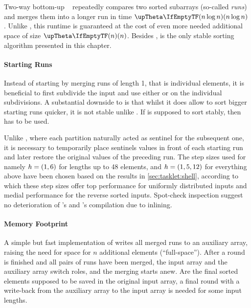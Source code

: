 \section{\texorpdfstring{\MS{}}{MergeSort}}
\label{sec:tasklet:merge}

Two-way bottom-up \MS{}~\cite{katajainen1997meticulous} repeatedly compares two sorted subarrays (so-called \emph{runs}) and merges them into a longer run in time \(\bigtheta{n \log n}\).
Unlike \QS{}, this runtime is guaranteed at the cost of even more needed additional space of size \(\bigtheta{n}\).
Besides \IS{}, \MS{} is the only stable sorting algorithm presented in this chapter.


\paragraph{Starting Runs}
Instead of starting by merging runs of length 1, that is individual elements, it is beneficial to first subdivide the input and use either \IS{} or \ShS{} on the individual subdivisions.
A substantial downside to \ShS{} is that whilst it does allow to sort bigger starting runs quicker, it is not stable unlike \IS{}.
If \MS{} is supposed to sort stably, then \IS{} has to be used.

Unlike \QS{}, where each partition naturally acted as sentinel for the subsequent one, it is necessary to temporarily place sentinels values in front of each starting run and later restore the original values of the preceding run.
The step sizes used for \ShS{} \Dash namely \(h = (1, 6)\) for lengths up to 48 elements, and \(h = (1, 5, 12)\) for everything above \Dash have been chosen based on the results in \cref{sec:tasklet:shell}, according to which these step sizes offer top performance for uniformly distributed inputs and medial performance for the reverse sorted inputs.
Spot-check inspection suggest no deterioration of \IS{}'s and \ShS{}'s compilation due to inlining.


\paragraph{Memory Footprint}
A simple but fast implementation of \MS{} writes all merged runs to an auxiliary array, raising the need for space for \(n\) additional elements (\enquote{full-space}).
After a round is finished and all pairs of runs have been merged, the input array and the auxiliary array switch roles, and the merging starts anew.
Are the final sorted elements supposed to be saved in the original input array, a final round with a write-back from the auxiliary array to the input array is needed for some input lengths.

